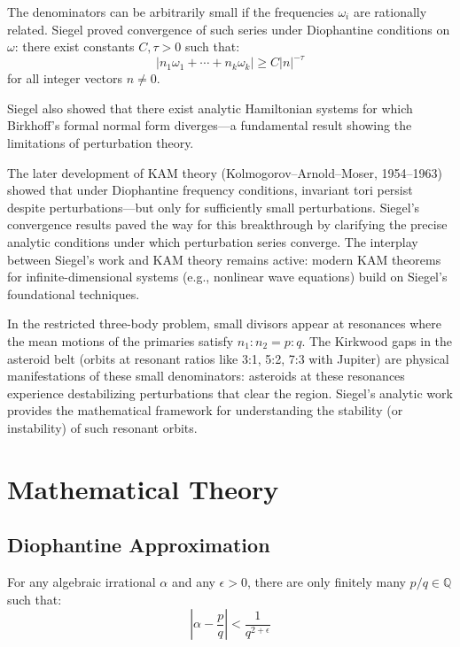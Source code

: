 The denominators can be arbitrarily small if the frequencies $\omega_i$ are rationally related. Siegel proved convergence of such series under Diophantine conditions on $\omega$: there exist constants $C, \tau > 0$ such that:
\[
|n_1\omega_1 + \cdots + n_k\omega_k| \geq C |n|^{-\tau}
\]
for all integer vectors $n \neq 0$.

Siegel also showed that there exist analytic Hamiltonian systems for which Birkhoff's formal normal form diverges---a fundamental result showing the limitations of perturbation theory.

The later development of KAM theory (Kolmogorov--Arnold--Moser, 1954--1963) showed that under Diophantine frequency conditions, invariant tori persist despite perturbations---but only for sufficiently small perturbations. Siegel's convergence results paved the way for this breakthrough by clarifying the precise analytic conditions under which perturbation series converge. The interplay between Siegel's work and KAM theory remains active: modern KAM theorems for infinite-dimensional systems (e.g., nonlinear wave equations) build on Siegel's foundational techniques.

In the restricted three-body problem, small divisors appear at resonances where the mean motions of the primaries satisfy $n_1 : n_2 = p : q$. The Kirkwood gaps in the asteroid belt (orbits at resonant ratios like 3:1, 5:2, 7:3 with Jupiter) are physical manifestations of these small denominators: asteroids at these resonances experience destabilizing perturbations that clear the region. Siegel's analytic work provides the mathematical framework for understanding the stability (or instability) of such resonant orbits.

\section{Mathematical Theory}

\subsection{Diophantine Approximation}

\begin{theorem}
For any algebraic irrational $\alpha$ and any $\epsilon > 0$, there are only finitely many $p/q \in \mathbb{Q}$ such that:
\[
\left|\alpha - \frac{p}{q}\right| < \frac{1}{q^{2+\epsilon}}
\]
\end{theorem}

